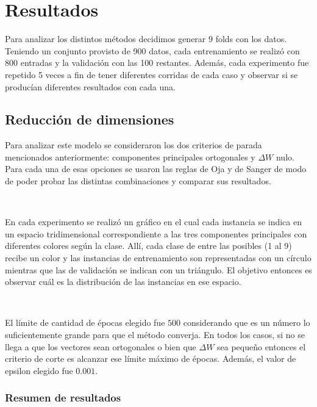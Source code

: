 \documentclass[informe.tex]{subfiles}
\begin{document}
  
  \section{Resultados}
    Para analizar los distintos métodos decidimos generar 9 folds con los datos. Teniendo un conjunto provisto de 900 datos, cada entrenamiento se realiz\'o con 800 entradas y la validación con las 100 restantes. Además, cada experimento fue repetido 5 veces a fin de tener diferentes corridas de cada caso y observar si se produc\'ian diferentes resultados con cada una.
    
    \subsection{Reducción de dimensiones}
      Para analizar este modelo se consideraron los dos criterios de parada mencionados anteriormente: componentes principales ortogonales y $\Delta W$ nulo. Para cada una de esas opciones se usaron las reglas de Oja y de Sanger de modo de poder probar las distintas combinaciones y comparar sus resultados. 
      
      ~
      
      En cada experimento se realizó un gráfico en el cual cada instancia se indica en un espacio tridimensional correspondiente a las tres componentes principales con diferentes colores según la clase. Allí, cada clase de entre las posibles (1 al 9) recibe un color y las instancias de entrenamiento son representadas con un círculo mientras que las de validación se indican con un triángulo. El objetivo entonces es observar cuál es la distribución de las instancias en ese espacio.
      
      ~
      
      El l\'imite de cantidad de \'epocas elegido fue $500$ considerando que es un n\'umero lo suficientemente grande para que el método converja. En todos los casos, si no se llega a que los vectores sean ortogonales o bien que $\Delta W$ sea pequeño entonces el criterio de corte es alcanzar ese límite máximo de épocas. Además, el valor de epsilon elegido fue $0.001$.

      \subsubsection{Resumen de resultados}
      
\end{document}
